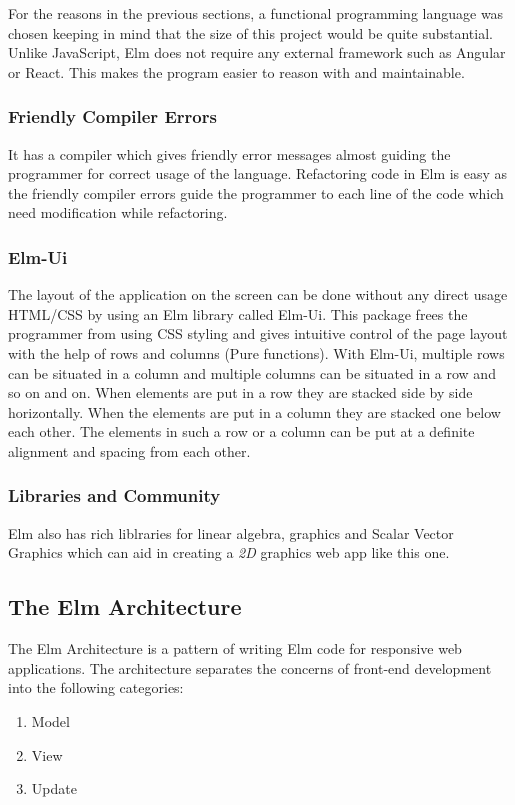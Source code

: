 For the reasons in the previous sections, a functional programming language was
chosen keeping in mind that the size of this project would be quite
substantial.  Unlike JavaScript, Elm does not require any external framework
such as Angular or React. This makes the program easier to reason with and
maintainable.

\subsubsection{Friendly Compiler Errors}
It has a compiler which gives friendly error messages almost guiding the
programmer for correct usage of the language. Refactoring code in Elm is easy
as the friendly compiler errors guide the programmer to each line of the code
which need modification while refactoring.

\subsubsection{Elm-Ui}
The layout of the application on the screen can be done without any direct
usage HTML/CSS by using an Elm library called Elm-Ui. This package frees the
programmer from using CSS styling and gives intuitive control of the page
layout with the help of rows and columns (Pure functions). With Elm-Ui,
multiple rows can be situated in a column and multiple columns can be situated
in a row and so on and on. When elements are put in a row they are stacked side
by side horizontally. When the elements are put in a column they are stacked
one below each other. The elements in such a row or a column can be put at a
definite alignment and spacing from each other.

\subsubsection{Libraries and Community}
Elm also has rich liblraries for linear algebra, graphics and Scalar Vector
Graphics which can aid in creating a \emph{2D} graphics web app like this one.

\subsection{The Elm Architecture}
\label{elm: architecture}
The Elm Architecture is a pattern of writing Elm code for responsive web
applications.  The architecture separates the concerns of front-end development
into the following categories:

\begin{enumerate}
\item Model
\item View
\item Update
\end{enumerate}

